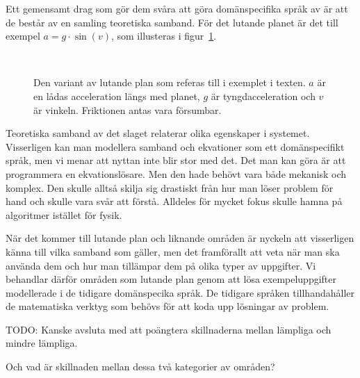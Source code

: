 \begin{binge}
Ett gemensamt drag som gör dem svåra att göra domänspecifika språk av är att de
består av en samling teoretiska samband. För det lutande planet är det till
exempel $a = g \cdot \sin(v)$, som illusteras i figur~\ref{fig:lutande_plan}.

\begin{figure}[tph]
  \caption{Den variant av lutande plan som referas till i exemplet i texten. $a$
  är en lådas acceleration längs med planet, $g$ är tyngdacceleration och $v$ är
  vinkeln. Friktionen antas vara försumbar.}~\label{fig:lutande_plan}
\end{figure}

Teoretiska samband av det slaget relaterar olika egenskaper i systemet.
Visserligen kan man modellera samband och ekvationer som ett domänspecifikt
språk, men vi menar att nyttan inte blir stor med det. Det man kan göra är att
programmera en ekvationslösare. Men den hade behövt vara både mekanisk och
komplex. Den skulle alltså skilja sig drastiskt från hur man löser problem för
hand och skulle vara svår att förstå. Alldeles för mycket fokus skulle hamna på
algoritmer istället för fysik.

När det kommer till lutande plan och liknande områden är nyckeln att visserligen
känna till vilka samband som gäller, men det framförallt att veta när man ska
använda dem och hur man tillämpar dem på olika typer av uppgifter. Vi behandlar
därför områden som lutande plan genom att lösa exempeluppgifter modellerade i de
tidigare domänspecika språk. De tidigare språken tillhandahåller de matematiska
verktyg som behövs för att koda upp lösningar av problem.


TODO: Kanske avsluta med att poängtera skillnaderna mellan lämpliga och mindre
lämpliga.

Och vad är skillnaden mellan dessa två kategorier av områden?


\end{binge}
